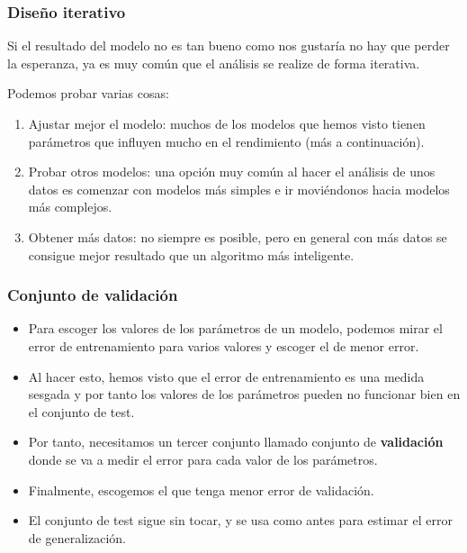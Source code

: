 \documentclass{beamer}
\newenvironment{wideitemize}{\itemize\addtolength{\itemsep}{12pt}}{\enditemize}
\begin{document}
\begin{frame}
\frametitle{Diseño iterativo}

\begin{wideitemize}
\item Si el resultado del modelo no es tan bueno como nos gustaría no hay que perder la esperanza, ya es muy común que el análisis se realize de forma iterativa.
\item Podemos probar varias cosas:
\begin{enumerate}
\item Ajustar mejor el modelo: muchos de los modelos que hemos visto tienen parámetros que influyen mucho en el rendimiento (más a continuación).
\item Probar otros modelos: una opción muy común al hacer el análisis de unos datos es comenzar con modelos más simples e ir moviéndonos hacia modelos más complejos.
\item Obtener más datos: no siempre es posible, pero en general con más datos se consigue mejor resultado que un algoritmo más inteligente.
\end{enumerate}
\end{wideitemize}
\end{frame}

\begin{frame}
\frametitle{Conjunto de validación}
\begin{itemize}
\item Para escoger los valores de los parámetros de un modelo, podemos mirar el error de entrenamiento para varios valores y escoger el de menor error.
\item Al hacer esto, hemos visto que el error de entrenamiento es una medida sesgada y por tanto los valores de los parámetros pueden no funcionar bien en el conjunto de test.
\item Por tanto, necesitamos un tercer conjunto llamado conjunto de \textbf{validación} donde se va a medir el error para cada valor de los parámetros.
\item Finalmente, escogemos el que tenga menor error de validación.
\item El conjunto de test sigue sin tocar, y se usa como antes para estimar el error de generalización.
\end{itemize}
\end{frame}
\end{document}
